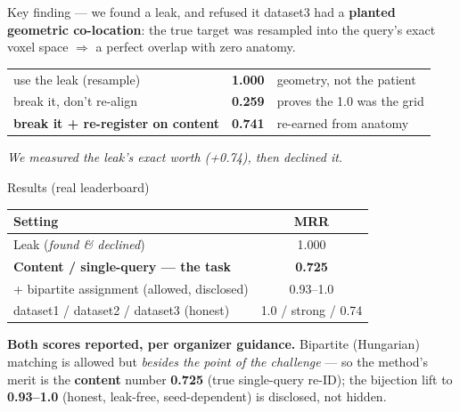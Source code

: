 \documentclass[aspectratio=169,11pt]{beamer}
\begin{document}
\begin{frame}{Key finding — we found a leak, and refused it}
  dataset3 had a \textbf{planted geometric co-location}: the true target was resampled into the
  query's exact voxel space $\Rightarrow$ a perfect overlap with \alert{zero anatomy}.
  \vfill
  \begin{center}\large
  \begin{tabular}{lcl}
    \toprule
    use the leak (resample) & \textbf{1.000} & \color{bad}geometry, not the patient\\
    break it, don't re-align & \textbf{0.259} & \color{bad}proves the 1.0 was the grid\\
    \textbf{break it + re-register on content} & \textbf{0.741} & \color{ok}re-earned from anatomy\\
    \bottomrule
  \end{tabular}
  \end{center}
  \vfill
  \begin{center}\itshape We measured the leak's exact worth (+0.74), then declined it.\end{center}
\end{frame}

\begin{frame}{Results (real leaderboard)}
  \begin{center}\large
  \begin{tabular}{lc}
    \toprule
    \textbf{Setting} & \textbf{MRR} \\
    \midrule
    Leak (\emph{found \& declined}) & 1.000 \\
    \textbf{\color{ok}Content / single-query — the task} & \textbf{\color{ok}0.725} \\
    \quad + bipartite assignment (allowed, disclosed) & 0.93--1.0 \\
    \midrule
    dataset1 / dataset2 / dataset3 (honest) & 1.0 / strong / 0.74 \\
    \bottomrule
  \end{tabular}
  \end{center}
  \vfill
  \footnotesize
  \textbf{Both scores reported, per organizer guidance.} Bipartite (Hungarian) matching is allowed
  but \emph{besides the point of the challenge} — so the method's merit is the \textbf{content}
  number \textbf{0.725} (true single-query re-ID); the bijection lift to \textbf{0.93--1.0}
  (honest, leak-free, seed-dependent) is disclosed, not hidden.
\end{frame}
\end{document}
